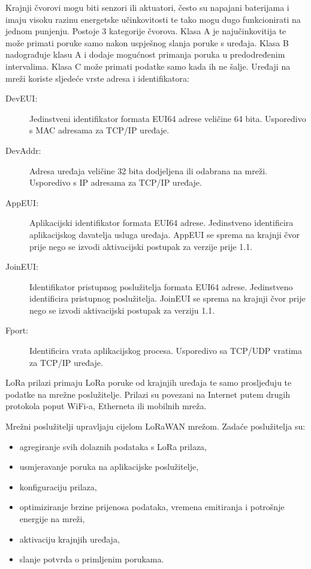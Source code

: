 \documentclass[times, utf8, diplomski]{fer}
\begin{document}
Krajnji čvorovi mogu biti senzori ili aktuatori, često su napajani baterijama i imaju visoku razinu energetske učinkovitosti te tako mogu dugo funkcionirati na jednom punjenju. Postoje 3 kategorije čvorova. Klasa A je najučinkovitija te može primati poruke samo nakon uspješnog slanja poruke s uređaja. Klasa B nadograđuje klasu A i dodaje mogućnost primanja poruka u predodređenim intervalima. Klasa C može primati podatke samo kada ih ne šalje. Uređaji na mreži koriste sljedeće vrste adresa i identifikatora:
\begin{description}
    \item[DevEUI:]Jedinstveni identifikator formata EUI64  adrese veličine 64 bita. Usporedivo s MAC adresama za TCP/IP uređaje.
    \item[DevAddr:]Adresa uređaja veličine 32 bita dodjeljena ili odabrana na mreži. Usporedivo s IP adresama za TCP/IP uređaje.
    \item[AppEUI:]Aplikacijski identifikator formata EUI64 adrese. Jedinstveno identificira aplikacijskog davatelja usluga uređaja. AppEUI se sprema na krajnji čvor prije nego se izvodi aktivacijski postupak za verzije prije 1.1.
    \item[JoinEUI:]Identifikator pristupnog poslužitelja formata EUI64 adrese. Jedinstveno identificira pristupnog poslužitelja. JoinEUI se sprema na krajnji čvor prije nego se izvodi aktivacijski postupak za verziju 1.1.
    \item[Fport:]Identificira vrata aplikacijskog procesa. Usporedivo sa TCP/UDP vratima za TCP/IP uređaje.
\end{description}

LoRa prilazi primaju LoRa poruke od krajnjih uređaja te samo prosljeđuju te podatke na mrežne poslužitelje. Prilazi su povezani na Internet putem drugih protokola poput WiFi-a, Etherneta ili mobilnih mreža.

Mrežni poslužitelji upravljaju cijelom LoRaWAN mrežom. Zadaće poslužitelja su:
\begin{itemize}
    \item agregiranje svih dolaznih podataka s LoRa prilaza,
    \item usmjeravanje poruka na aplikacijske poslužitelje,
    \item konfiguraciju prilaza,
    \item optimiziranje brzine prijenosa podataka, vremena emitiranja i potrošnje energije na mreži,
    \item aktivaciju krajnjih uređaja,
    \item slanje potvrda o primljenim porukama.
\end{itemize}
\end{document}
